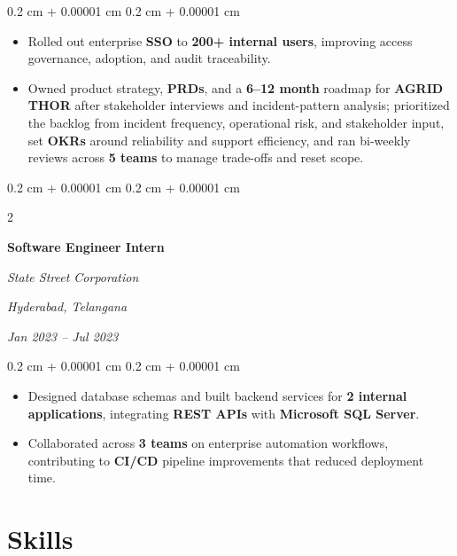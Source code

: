\documentclass[10pt, letterpaper]{article}
\newenvironment{highlights}{
    \begin{itemize}[
        topsep=0.10 cm,
        parsep=0.10 cm,
        partopsep=0pt,
        itemsep=0pt,
        leftmargin=0.4 cm + 10pt
    ]
}{
    \end{itemize}
} %
\newenvironment{onecolentry}{
    \begin{adjustwidth}{
        0.2 cm + 0.00001 cm
    }{
        0.2 cm + 0.00001 cm
    }
}{
    \end{adjustwidth}
} %
\newenvironment{twocolentry}[2][]{
    \onecolentry
    \def\secondColumn{#2}
    \setcolumnwidth{\fill, 4.5 cm}
    \begin{paracol}{2}
}{
    \switchcolumn \raggedleft \secondColumn
    \end{paracol}
    \endonecolentry
} %
\begin{document}
\begin{onecolentry}
\begin{highlights}
                \item Rolled out enterprise \textbf{SSO} to \textbf{200+ internal users}, improving access governance, adoption, and audit traceability.

                \item Owned product strategy, \textbf{PRDs}, and a \textbf{6–12 month} roadmap for \textbf{AGRID THOR} after stakeholder interviews and incident-pattern analysis; prioritized the backlog from incident frequency, operational risk, and stakeholder input, set \textbf{OKRs} around reliability and support efficiency, and ran bi-weekly reviews across \textbf{5 teams} to manage trade-offs and reset scope.

                
            
            \end{highlights}
        \end{onecolentry}

        \vspace{0.2 cm}

        \begin{twocolentry}{
        \textit{Hyderabad, Telangana}    
            
        \textit{Jan 2023 – Jul 2023}}
            \textbf{Software Engineer Intern}
            
            \textit{State Street Corporation}
        \end{twocolentry}

        \vspace{0.10 cm}
        \begin{onecolentry}
            \begin{highlights}
                \item Designed database schemas and built backend services for \textbf{2 internal applications}, integrating \textbf{REST APIs} with \textbf{Microsoft SQL Server}.
                \item Collaborated across \textbf{3 teams} on enterprise automation workflows, contributing to \textbf{CI/CD} pipeline improvements that reduced deployment time.
            \end{highlights}
        \end{onecolentry}

        \vspace{0.15 cm}

    \section{Skills}
\end{document}
